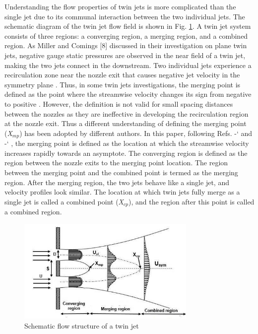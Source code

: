 \documentclass[Afour,sagev,times]{sagej}
\newcommand*{\citen}[1]{%
  \begingroup
    \romannumeral-`\x %
    \setcitestyle{numbers}%
    \cite{#1}%
  \endgroup   
}
\begin{document}
Understanding the flow properties of twin jets is more complicated than the single jet due to its communal interaction between the two individual jets. The schematic diagram of the twin jet flow field is shown in Fig. \ref{fig:twinjet flow}. A twin jet system consists of three regions: a converging region, a merging region, and a combined region. As Miller and Comings [8] discussed in their investigation on plane twin jets, negative gauge static pressures are observed in the near field of a twin jet, making the two jets connect in the downstream. Two individual jets experience a recirculation zone near the nozzle exit that causes negative jet velocity in the symmetry plane \cite{miller1960force,lin1990investigation}. Thus, in some twin jets investigations, the merging point is defined as the point where the streamwise velocity changes its sign from negative to positive \cite{lin1990investigation}. However, the definition is not valid for small spacing distances between the nozzles as they are ineffective in developing the recirculation region at the nozzle exit. Thus a different understanding of defining the merging point (\textit{X${}_{mp}$}) has been adopted by different authors. In this paper, following Refs. \citen{laban2019experimental} and \citen{aleyasin2019statistical}, the merging point is defined as the location at which the streamwise velocity increases rapidly towards an asymptote. The converging region is defined as the region between the nozzle exits to the merging point location. The region between the merging point and the combined point is termed as the merging region. After the merging region, the two jets behave like a single jet, and velocity profiles look similar. The location at which twin jets fully merge as a single jet is called a combined point (\textit{X${}_{cp}$}), and the region after this point is called a combined region. 
\begin{figure}[h]
\centering
\includegraphics[width=3.4in]{twin jet flow field.png}
\caption{Schematic flow structure of a twin jet }
\label{fig:twinjet flow}
\end{figure}
\end{document}
